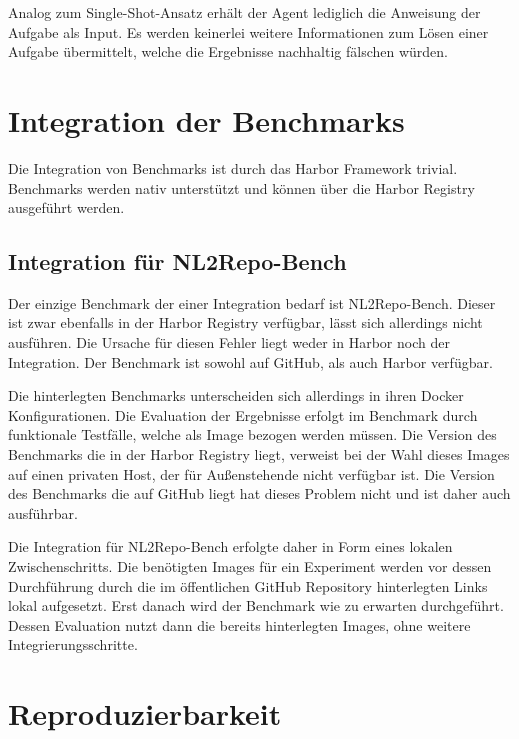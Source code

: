 Analog zum Single-Shot-Ansatz erhält der Agent lediglich die Anweisung der Aufgabe als Input. Es werden keinerlei weitere Informationen zum Lösen einer Aufgabe übermittelt, welche die Ergebnisse nachhaltig fälschen würden. 

\section{Integration der Benchmarks}\label{ch:Integration der Benchmarks}

Die Integration von Benchmarks ist durch das Harbor Framework trivial. Benchmarks werden nativ unterstützt und können über die Harbor Registry ausgeführt werden.


\subsection{Integration für NL2Repo-Bench}

Der einzige Benchmark der einer Integration bedarf ist NL2Repo-Bench. Dieser ist zwar ebenfalls in der Harbor Registry verfügbar, lässt sich allerdings nicht ausführen. Die Ursache für diesen Fehler liegt weder in Harbor noch der Integration. Der Benchmark ist sowohl auf GitHub\cite{GitHubMultimodalartprojectionNL2RepoBench2026}, als auch Harbor\cite{HarborHub} verfügbar.

Die hinterlegten Benchmarks unterscheiden sich allerdings in ihren Docker Konfigurationen. Die Evaluation der Ergebnisse erfolgt im Benchmark durch funktionale Testfälle, welche als Image bezogen werden müssen. Die Version des Benchmarks die in der Harbor Registry liegt, verweist bei der Wahl dieses Images auf einen privaten Host, der für Außenstehende nicht verfügbar ist. Die Version des Benchmarks die auf GitHub liegt hat dieses Problem nicht und ist daher auch ausführbar.

Die Integration für NL2Repo-Bench erfolgte daher in Form eines lokalen Zwischenschritts. Die benötigten Images für ein Experiment werden vor dessen Durchführung durch die im öffentlichen GitHub Repository hinterlegten Links lokal aufgesetzt. Erst danach wird der Benchmark wie zu erwarten durchgeführt. Dessen Evaluation nutzt dann die bereits hinterlegten Images, ohne weitere Integrierungsschritte.

\section{Reproduzierbarkeit}\label{ch:Reproduzierbarkeit}

